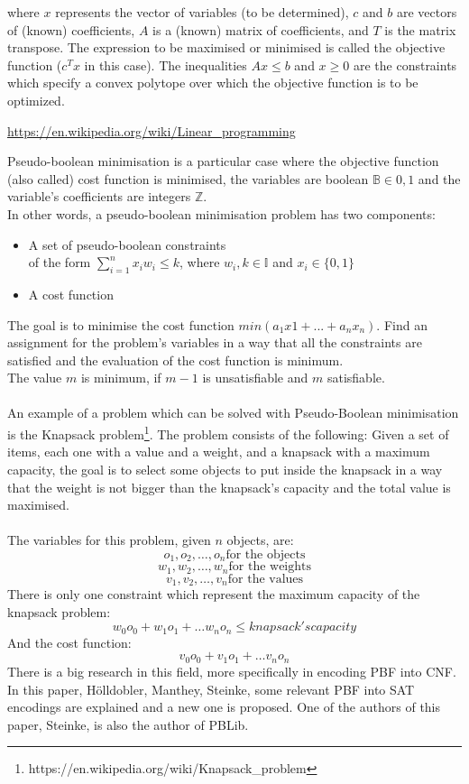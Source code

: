 where $x$ represents the vector of variables (to be determined), $c$ and $b$ are vectors of (known) coefficients, $A$ is a (known) matrix of coefficients, and $T$ is the matrix transpose. The expression to be maximised or minimised is called the objective function ($c^Tx$ in this case). The inequalities $Ax \leq b $ and $x \geq 0$ are the constraints which specify a convex polytope over which the objective function is to be optimized.
\begin{center}
	\href{https://en.wikipedia.org/wiki/Linear\_programming}{https://en.wikipedia.org/wiki/Linear\_programming}
\end{center}
\noindent\makebox[\linewidth]{\rule{\linewidth}{0.4pt}}
Pseudo-boolean minimisation is a particular case where the objective function (also called) cost function is minimised, the variables are boolean $\mathbb{B} \in {0,1}$ and the variable’s coefficients are integers $\mathbb{Z}$.  \\
In other words, a pseudo-boolean minimisation problem has two components: 
\begin{itemize}
	\item A set of pseudo-boolean constraints \\
	of the form $\sum_{i=1}^{n} x_{i}w_{i} \leq k$, where $w_{i},k \in \mathbb{I}$ and $x_{i} \in \{0,1\}$
	\item A cost function
\end{itemize}
The goal is to minimise the cost function $min(a_{1}x{1} + ... + a_{n}x_{n})$. Find an assignment for the problem’s variables in a way that all the constraints are satisfied and the evaluation of the cost function is minimum.  \\
The value $m$ is minimum, if $m-1$ is unsatisfiable and $m$ satisfiable.  \\\\
An example of a problem which can be solved with Pseudo-Boolean minimisation is the Knapsack problem\footnote{https://en.wikipedia.org/wiki/Knapsack\_problem}.
The problem consists of the following: Given a set of items, each one with a value and a weight, and a knapsack with a maximum capacity, the goal is to select some objects to put inside the knapsack in a way that the weight is not bigger than the knapsack's capacity and the total value is maximised. \\\\
The variables for this problem, given $n$ objects, are:
$$o_1, o_2, \ldots , o_n \text{for the objects}$$
$$w_1, w_2, \ldots , w_n \text{for the weights}$$
$$v_1, v_2, \ldots , v_n \text{for the values}$$
There is only one constraint which represent the maximum capacity of the knapsack problem:
$$w_0 o_0 + w_1 o_1+  \ldots w_n o_n \leq knapsack's capacity$$
And the cost function:
$$v_0 o_0 + v_1 o_1+  \ldots v_n o_n $$
There is a big research in this field, more specifically in encoding PBF into CNF. In this paper, Hölldobler, Manthey, Steinke\cite{Holldobler}, some relevant PBF into SAT encodings are explained and a new one is proposed. One of the authors of this paper, Steinke, is also the author of PBLib. 
 

